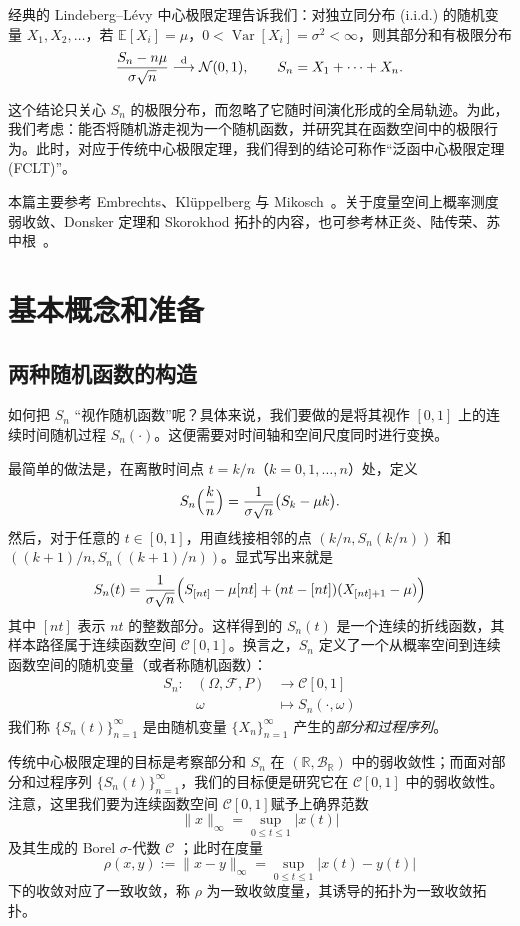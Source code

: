 经典的 Lindeberg--L\'evy 中心极限定理告诉我们：对独立同分布 (i.i.d.) 的随机变量 $X_1,X_2,\dots$，若 $\mathbb E[X_i]=\mu$，$0<\operatorname{Var}[X_i]=\sigma^2<\infty$，则其部分和有极限分布
\[
\frac{S_n-n\mu}{\sigma\sqrt n}\overset{\rm d}\longrightarrow\mathcal N(0,1),
\qquad S_n=X_1+\cdots+X_n.
\]

这个结论只关心 $S_n$ 的极限分布，而忽略了它随时间演化形成的全局轨迹。为此，我们考虑：能否将随机游走视为一个随机函数，并研究其在函数空间中的极限行为。此时，对应于传统中心极限定理，我们得到的结论可称作“泛函中心极限定理 (FCLT)”。

本篇主要参考 Embrechts、Kl\"uppelberg 与 Mikosch~\cite[第 2.4 节及附录 A2]{embrechts1997}。关于度量空间上概率测度弱收敛、Donsker 定理和 Skorokhod 拓扑的内容，也可参考林正炎、陆传荣、苏中根~\cite[第 5 章]{linluzhang2023}。

\section{基本概念和准备}

\subsection{两种随机函数的构造}

如何把 $S_n$ ``视作随机函数''呢？具体来说，我们要做的是将其视作 $[0,1]$ 上的连续时间随机过程 $S_n(\cdot)$。这便需要对时间轴和空间尺度同时进行变换。

最简单的做法是，在离散时间点 $t = k/n$（$k = 0,1,\dots,n$）处，定义
\[S_n\Bigl(\frac{k}{n}\Bigr) = \frac{1}{\sigma\sqrt{n}} \bigl( S_k - \mu k \bigr).\]
然后，对于任意的 $t \in [0,1]$，用直线接相邻的点 $(k/n, S_n(k/n))$ 和 $((k+1)/n, S_n((k+1)/n))$。显式写出来就是
\[S_n(t)=\frac{1}{\sigma\sqrt{n}}  \Bigl(S_{[nt]}-\mu [nt]+(nt-[nt])(X_{[nt]+1}-\mu)\Bigr)\]
其中 $[nt]$ 表示 $nt$ 的整数部分。这样得到的 $S_n(t)$ 是一个连续的折线函数，其样本路径属于连续函数空间 $\mathcal{C}[0,1]$。换言之，$S_n$ 定义了一个从概率空间到连续函数空间的随机变量（或者称随机函数）：
\[\begin{array}{ccl} S_n: & (\Omega,\mathscr F, P)&\to \mathcal C[0,1]\\ & \omega &\mapsto  S_n(\cdot,\omega) \end{array}\]
我们称 $\{S_n(t)\}_{n=1}^\infty$ 是由随机变量 $\{X_n\}_{n=1}^\infty$ 产生的\emph{部分和过程序列}。

传统中心极限定理的目标是考察部分和 $S_n$ 在 $(\mathbb R,\mathcal B_{\mathbb R})$ 中的弱收敛性；而面对部分和过程序列 $\{S_n(t)\}_{n=1}^\infty$，我们的目标便是研究它在 $\mathcal C[0,1]$ 中的弱收敛性。注意，这里我们要为连续函数空间 $\mathcal C[0,1]$赋予上确界范数
\[\|x\|_\infty = \sup_{0\le t\le 1}|x(t)|\]
及其生成的 Borel $\sigma$-代数 $\mathscr C$ ；此时在度量 \[ \rho(x,y):=\|x-y\|_\infty=\sup\limits_{0\le t\le 1}|x(t)-y(t)| \]下的收敛对应了一致收敛，称 $\rho$ 为一致收敛度量，其诱导的拓扑为一致收敛拓扑。

